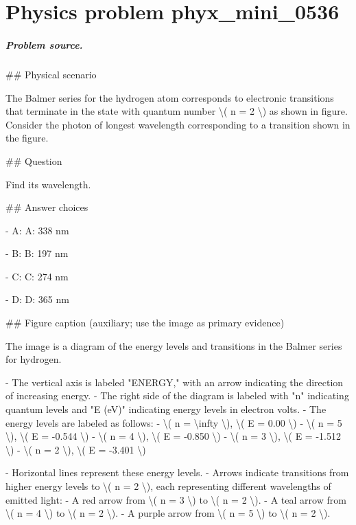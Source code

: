 
\chapter{Physics problem phyx\_mini\_0536}
\label{ch:PhyXMiniProblems_problem_phyx_mini_0536}

\paragraph{Problem source.}
\#\# Physical scenario

The Balmer series for the hydrogen atom corresponds to electronic transitions that terminate in the state with quantum number \textbackslash{}( n = 2 \textbackslash{}) as shown in figure. Consider the photon of longest wavelength corresponding to a transition shown in the figure.

\#\# Question

Find its wavelength.

\#\# Answer choices

- A: A: 338 nm

- B: B: 197 nm

- C: C: 274 nm

- D: D: 365 nm

\#\# Figure caption (auxiliary; use the image as primary evidence)

The image is a diagram of the energy levels and transitions in the Balmer series for hydrogen.

- The vertical axis is labeled "ENERGY," with an arrow indicating the direction of increasing energy.
- The right side of the diagram is labeled with "n" indicating quantum levels and "E (eV)" indicating energy levels in electron volts.
- The energy levels are labeled as follows:
  - \textbackslash{}( n = \textbackslash{}infty \textbackslash{}), \textbackslash{}( E = 0.00 \textbackslash{})
  - \textbackslash{}( n = 5 \textbackslash{}), \textbackslash{}( E = -0.544 \textbackslash{})
  - \textbackslash{}( n = 4 \textbackslash{}), \textbackslash{}( E = -0.850 \textbackslash{})
  - \textbackslash{}( n = 3 \textbackslash{}), \textbackslash{}( E = -1.512 \textbackslash{})
  - \textbackslash{}( n = 2 \textbackslash{}), \textbackslash{}( E = -3.401 \textbackslash{})

- Horizontal lines represent these energy levels.
- Arrows indicate transitions from higher energy levels to \textbackslash{}( n = 2 \textbackslash{}), each representing different wavelengths of emitted light:
  - A red arrow from \textbackslash{}( n = 3 \textbackslash{}) to \textbackslash{}( n = 2 \textbackslash{}).
  - A teal arrow from \textbackslash{}( n = 4 \textbackslash{}) to \textbackslash{}( n = 2 \textbackslash{}).
  - A purple arrow from \textbackslash{}( n = 5 \textbackslash{}) to \textbackslash{}( n = 2 \textbackslash{}).

